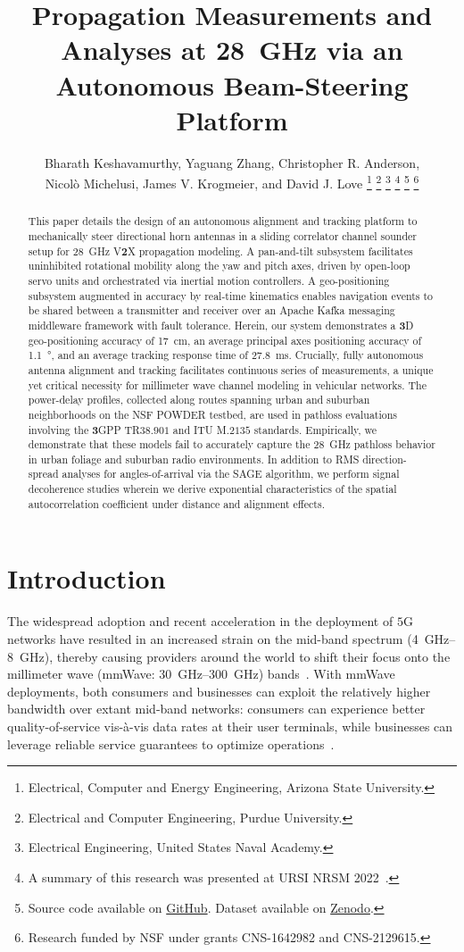 \documentclass[10pt, twocolumn]{IEEEtran}
\title{Propagation Measurements and Analyses at \SI{28}{\giga\hertz} via an Autonomous Beam-Steering Platform}
\author{Bharath Keshavamurthy\IEEEauthorrefmark{1}, Yaguang Zhang\IEEEauthorrefmark{2}, Christopher R. Anderson\IEEEauthorrefmark{3},\\Nicol\`{o} Michelusi\IEEEauthorrefmark{1}, James V. Krogmeier\IEEEauthorrefmark{2}, and David J. Love\IEEEauthorrefmark{2}
\thanks{\IEEEauthorrefmark{1}Electrical, Computer and Energy Engineering, Arizona State University.}
\thanks{\IEEEauthorrefmark{2}Electrical and Computer Engineering, Purdue University.}
\thanks{\IEEEauthorrefmark{3}Electrical Engineering, United States Naval Academy.}
\thanks{A summary of this research was presented at URSI NRSM 2022~\cite{NRSM}.}
\thanks{Source code available on \href{https://github.com/bharathkeshavamurthy/SPAVE-28G.git}{GitHub}\cite{SPAVE-28G-Software}. Dataset available on \href{https://doi.org/10.5281/zenodo.7178597}{Zenodo}\cite{SPAVE-28G-Dataset}.}
\thanks{Research funded by NSF under grants CNS-1642982 and CNS-2129615.}
\vspace{-12mm}
}
\begin{document}

\maketitle
\thispagestyle{empty}
\pagestyle{empty}
\vspace{-12mm}

\begin{abstract}
This paper details the design of an autonomous alignment and tracking platform to mechanically steer directional horn antennas in a sliding correlator channel sounder setup for \SI{28}{\giga\hertz} V$\bm{2}$X propagation modeling. A pan-and-tilt subsystem facilitates uninhibited rotational mobility along the yaw and pitch axes, driven by open-loop servo units and orchestrated via inertial motion controllers. A geo-positioning subsystem augmented in accuracy by real-time kinematics enables navigation events to be shared between a transmitter and receiver over an Apache Kafka messaging middleware framework with fault tolerance. Herein, our system demonstrates a $\bm{3}$D geo-positioning accuracy of \SI{17}{\centi\meter}, an average principal axes positioning accuracy of \SI{1.1}{\degree}, and an average tracking response time of \SI{27.8}{\milli\second}. Crucially, fully autonomous antenna alignment and tracking facilitates continuous series of measurements, a unique yet critical necessity for millimeter wave channel modeling in vehicular networks. The power-delay profiles, collected along routes spanning urban and suburban neighborhoods on the NSF POWDER testbed, are used in pathloss evaluations involving the $\bm{3}$GPP TR$\bm{38.901}$ and ITU M$\bm{.2135}$ standards. Empirically, we demonstrate that these models fail to accurately capture the \SI{28}{\giga\hertz} pathloss behavior in urban foliage and suburban radio environments. In addition to RMS direction-spread analyses for angles-of-arrival via the SAGE algorithm, we perform signal decoherence studies wherein we derive exponential characteristics of the spatial autocorrelation coefficient under distance and alignment effects.
\end{abstract}
\vspace{-10mm}

\section{Introduction}\label{S1}
The widespread adoption and recent acceleration in the deployment of $5$G networks have resulted in an increased strain on the mid-band spectrum (\SIrange{4}{8}{\giga\hertz}), thereby causing providers around the world to shift their focus onto the millimeter wave (mmWave: \SIrange{30}{300}{\giga\hertz}) bands~\cite{Commercial}. With mmWave deployments, both consumers and businesses can exploit the relatively higher bandwidth over extant mid-band networks: consumers can experience better quality-of-service vis-\`{a}-vis data rates at their user terminals, while businesses can leverage reliable service guarantees to optimize operations~\cite{Rappaport}. 
\end{document}
